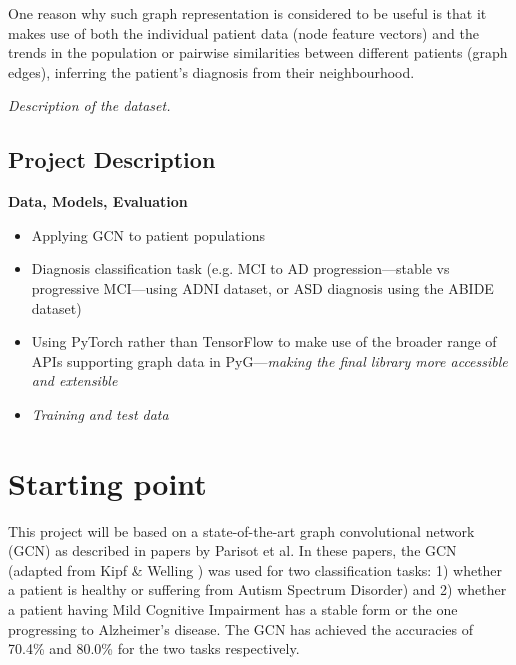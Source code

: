 \documentclass[12pt,a4paper,twoside]{article}
\begin{document}
One reason why such graph representation is considered to be useful is that it makes use of both the individual patient data (node feature vectors) and the trends in the population or pairwise similarities between different patients (graph edges), inferring the patient's diagnosis from their neighbourhood. 


\textit{Description of the dataset.}

\subsection*{Project Description}
\textbf{Data, Models, Evaluation}

\begin{itemize}
  \item Applying GCN to patient populations
  \item Diagnosis classification task (e.g. MCI to AD progression—stable vs progressive MCI—using ADNI dataset, or ASD diagnosis using the ABIDE dataset)
  \item Using PyTorch rather than TensorFlow to make use of the broader range of APIs supporting graph data in PyG—\textit{making the final library more accessible and extensible}
  \item \textit{Training and test data}
\end{itemize}

\section*{Starting point}


This project will be based on a state-of-the-art graph convolutional network (GCN) as described in papers by Parisot et al. \cite{parisot2017spectral, parisot2018disease} In these papers, the GCN (adapted from Kipf \& Welling \cite{kipf2017semi}) was used for two classification tasks: 1) whether a patient is  healthy or suffering from Autism Spectrum Disorder) and 2) whether a patient having Mild Cognitive Impairment has a stable form or the one progressing to Alzheimer's disease. The GCN has achieved the accuracies of 70.4\% and 80.0\% for the two tasks respectively. 
\end{document}
